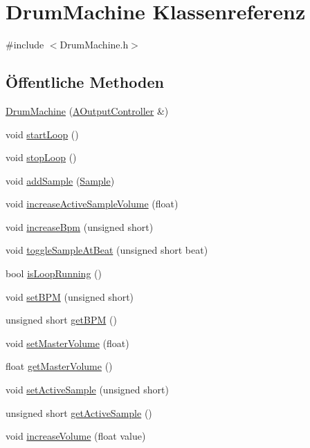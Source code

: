 \hypertarget{class_drum_machine}{}\section{Drum\+Machine Klassenreferenz}
\label{class_drum_machine}


{\ttfamily \#include $<$Drum\+Machine.\+h$>$}

\subsection*{Öffentliche Methoden}
\begin{DoxyCompactItemize}
\item 
\hyperlink{class_drum_machine_a2b038c37477e742bd3ce70e7f7bb6af5}{Drum\+Machine} (\hyperlink{class_a_output_controller}{A\+Output\+Controller} \&)
\item 
void \hyperlink{class_drum_machine_ac42508031bbf331d41c8004ed663c1c1}{start\+Loop} ()
\item 
void \hyperlink{class_drum_machine_af1564a42f1c2717534a61437617070b3}{stop\+Loop} ()
\item 
void \hyperlink{class_drum_machine_a530ac2c3529492c62a01619786fb3765}{add\+Sample} (\hyperlink{class_sample}{Sample})
\item 
void \hyperlink{class_drum_machine_ac4cda2cfef390426515f11cf9ee3199c}{increase\+Active\+Sample\+Volume} (float)
\item 
void \hyperlink{class_drum_machine_ab40423c6a37efad94389ffb19a0ccae9}{increase\+Bpm} (unsigned short)
\item 
void \hyperlink{class_drum_machine_ac34e64779cd419a75628630f71a3041b}{toggle\+Sample\+At\+Beat} (unsigned short beat)
\item 
bool \hyperlink{class_drum_machine_aaa0c2e00a5009b239aac709c37602c7d}{is\+Loop\+Running} ()
\item 
void \hyperlink{class_drum_machine_aaa50ac48ccdbf81a9ed5c7b3e2a5560d}{set\+B\+PM} (unsigned short)
\item 
unsigned short \hyperlink{class_drum_machine_a9a7a34dca1803071fec5b6687cb98343}{get\+B\+PM} ()
\item 
void \hyperlink{class_drum_machine_a2723072af5049c67e990b1eba9351d81}{set\+Master\+Volume} (float)
\item 
float \hyperlink{class_drum_machine_a3590f99d021aad35cca24fdcb0f8a246}{get\+Master\+Volume} ()
\item 
void \hyperlink{class_drum_machine_a28c17f251dc26e48b518e4863c33d6e8}{set\+Active\+Sample} (unsigned short)
\item 
unsigned short \hyperlink{class_drum_machine_ac8ef152a82bbce61bc1e2715c3e476b9}{get\+Active\+Sample} ()
\item 
void \hyperlink{class_drum_machine_ab823055aa6c1fa1dd91b1e45f3e66f0f}{increase\+Volume} (float value)
\end{DoxyCompactItemize}
